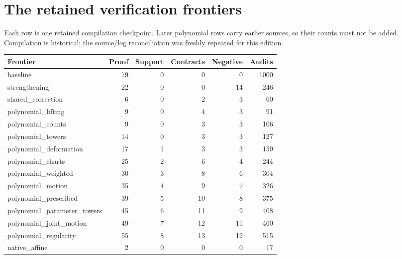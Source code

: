 \section{The retained verification frontiers}\label{sec:frontiers}
Each row is one retained compilation checkpoint. Later polynomial rows carry earlier sources, so their counts must not be added. Compilation is historical; the source/log reconciliation was freshly repeated for this edition.
\begin{longtable}{p{.36\linewidth}rrrrr}
\toprule Frontier & Proof & Support & Contracts & Negative & Audits\\\midrule\endhead
baseline & 79 & 0 & 0 & 0 & 1000\\
strengthening & 22 & 0 & 0 & 14 & 246\\
shared\_correction & 6 & 0 & 2 & 3 & 60\\
polynomial\_lifting & 9 & 0 & 4 & 3 & 91\\
polynomial\_counts & 9 & 0 & 3 & 3 & 106\\
polynomial\_towers & 14 & 0 & 3 & 3 & 127\\
polynomial\_deformation & 17 & 1 & 3 & 3 & 159\\
polynomial\_charts & 25 & 2 & 6 & 4 & 244\\
polynomial\_weighted & 30 & 3 & 8 & 6 & 304\\
polynomial\_motion & 35 & 4 & 9 & 7 & 326\\
polynomial\_prescribed & 39 & 5 & 10 & 8 & 375\\
polynomial\_parameter\_towers & 45 & 6 & 11 & 9 & 408\\
polynomial\_joint\_motion & 49 & 7 & 12 & 11 & 460\\
polynomial\_regularity & 55 & 8 & 13 & 12 & 515\\
native\_affine & 2 & 0 & 0 & 0 & 17\\
\bottomrule\end{longtable}
